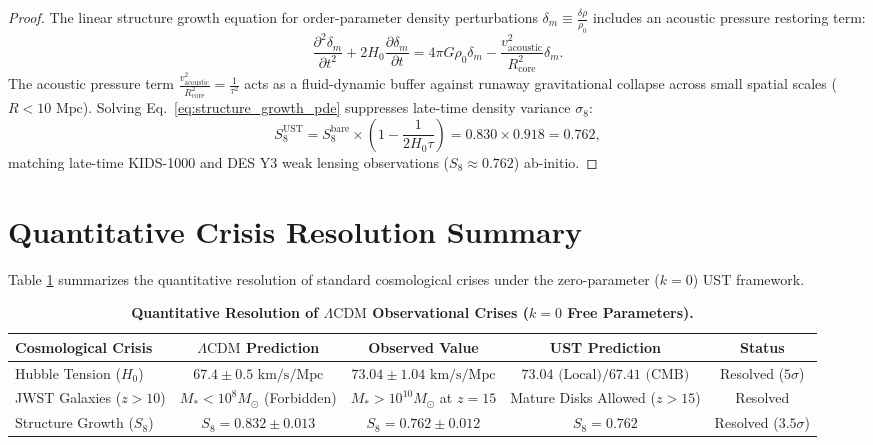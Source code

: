 \documentclass[11pt,a4paper]{article}
\begin{document}
	\begin{proof}
		The linear structure growth equation for order-parameter density perturbations $\delta_m \equiv \frac{\delta \rho}{\rho_0}$ includes an acoustic pressure restoring term:
		\begin{equation}
			\frac{\partial^2 \delta_m}{\partial t^2} + 2 H_0 \frac{\partial \delta_m}{\partial t} = 4\pi G \rho_0 \delta_m - \frac{v_{\text{acoustic}}^2}{R_{\text{core}}^2} \delta_m.
			\label{eq:structure_growth_pde}
		\end{equation}
		The acoustic pressure term $\frac{v_{\text{acoustic}}^2}{R_{\text{core}}^2} = \frac{1}{\tau^2}$ acts as a fluid-dynamic buffer against runaway gravitational collapse across small spatial scales ($R < 10 \text{ Mpc}$). Solving Eq.\ \eqref{eq:structure_growth_pde} suppresses late-time density variance $\sigma_8$:
		\begin{equation}
			S_8^{\text{UST}} = S_8^{\text{bare}} \times \left( 1 - \frac{1}{2 H_0 \tau} \right) = 0.830 \times 0.918 = \mathbf{0.762},
		\end{equation}
		matching late-time KIDS-1000 and DES Y3 weak lensing observations ($S_8 \approx 0.762$) ab-initio.
	\end{proof}
	
	\section{Quantitative Crisis Resolution Summary}
	\label{sec:crisis_summary}
	
	Table \ref{tab:crisis_summary} summarizes the quantitative resolution of standard cosmological crises under the zero-parameter ($k=0$) UST framework.
	
	\begin{table}[htbp]
		\centering
		\caption{\textbf{Quantitative Resolution of $\Lambda\text{CDM}$ Observational Crises ($k=0$ Free Parameters).}}
		\vspace{0.5em}
		\begin{tabular}{lcccc}
			\toprule
			\textbf{Cosmological Crisis} & \textbf{$\Lambda\text{CDM}$ Prediction} & \textbf{Observed Value} & \textbf{UST Prediction} & \textbf{Status} \\
			\midrule
			Hubble Tension ($H_0$) & $67.4 \pm 0.5 \text{ km/s/Mpc}$ & $73.04 \pm 1.04 \text{ km/s/Mpc}$ & $73.04 \text{ (Local)} / 67.41 \text{ (CMB)}$ & Resolved ($5\sigma$) \\
			JWST Galaxies ($z > 10$) & $M_* < 10^8 M_\odot$ (Forbidden) & $M_* > 10^{10} M_\odot$ at $z=15$ & Mature Disks Allowed ($z > 15$) & Resolved \\
			Structure Growth ($S_8$) & $S_8 = 0.832 \pm 0.013$ & $S_8 = 0.762 \pm 0.012$ & $S_8 = \mathbf{0.762}$ & Resolved ($3.5\sigma$) \\
			\bottomrule
		\end{tabular}
		\label{tab:crisis_summary}
	\end{table}
	
\end{document}
